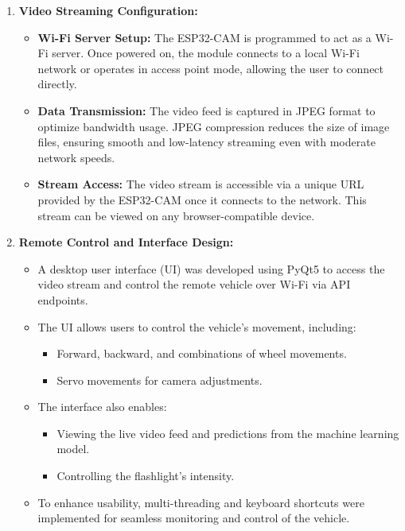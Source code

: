 \documentclass[12pt,a4paper]{report}
\begin{document}
\begin{enumerate}
    
    \item \textbf{Video Streaming Configuration:}
    \begin{itemize}
        \item \textbf{Wi-Fi Server Setup:} The ESP32-CAM is programmed to act as a Wi-Fi server. Once powered on, the module connects to a local Wi-Fi network or operates in access point mode, allowing the user to connect directly.
        \item \textbf{Data Transmission:} The video feed is captured in JPEG format to optimize bandwidth usage. JPEG compression reduces the size of image files, ensuring smooth and low-latency streaming even with moderate network speeds.
        \item \textbf{Stream Access:} The video stream is accessible via a unique URL provided by the ESP32-CAM once it connects to the network. This stream can be viewed on any browser-compatible device.
    \end{itemize}
    
\item \textbf{Remote Control and Interface Design:}
\begin{itemize}
    \item A desktop user interface (UI) was developed using PyQt5 to access the video stream and control the remote vehicle over Wi-Fi via API endpoints.
    \item The UI allows users to control the vehicle's movement, including:
    \begin{itemize}
        \item Forward, backward, and combinations of wheel movements.
        \item Servo movements for camera adjustments.
    \end{itemize}
    \item The interface also enables:
    \begin{itemize}
        \item Viewing the live video feed and predictions from the machine learning model.
        \item Controlling the flashlight's intensity.
    \end{itemize}
    \item To enhance usability, multi-threading and keyboard shortcuts were implemented for seamless monitoring and control of the vehicle.
\end{itemize}


\end{enumerate}
\end{document}
